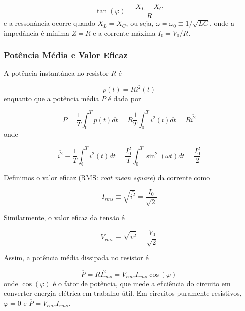 \documentclass{article}
\begin{document}
\begin{equation}
    \tan(\varphi) = \frac{X_L - X_C}{R}
\end{equation} e a ressonância ocorre quando \(X_L = X_C\), ou seja, \(\omega = \omega_0 \equiv 1/\sqrt{LC}\), onde a impedância é mínima \(Z = R\) e a corrente máxima \(I_0 = V_0/R\).

\subsubsection{Potência Média e Valor Eficaz}

A potência instantânea no resistor \(R\) é

\begin{equation}
    p(t) = Ri^2(t)
\end{equation} enquanto que a potência média \(\overline{P}\) é dada por

\begin{equation}
    \overline{P} = \frac{1}{T} \int_0^T p(t) dt = R \frac{1}{T} \int_0^T i^2(t) dt = R\overline{i^2}
\end{equation} onde 

\begin{equation}
    \overline{i^2} \equiv \frac{1}{T} \int_0^T i^2(t) dt = \frac{I_0^2}{T} \int_0^T \sin^2(\omega t) dt = \frac{I_0^2}{2}
\end{equation}

Definimos o valor eficaz (RMS: \emph{root mean square}) da corrente como

\begin{equation}
    \boxed{I_{rms} \equiv \sqrt{\overline{i^2}} = \frac{I_0}{\sqrt{2}}}
\end{equation}

Similarmente, o valor eficaz da tensão é

\begin{equation}
    \boxed{V_{rms} \equiv \sqrt{\overline{v^2}} = \frac{V_0}{\sqrt{2}}}
\end{equation}

Assim, a potência média dissipada no resistor é

\begin{equation}
    \boxed{\overline{P} = R I_{rms}^2 = V_{rms} I_{rms} \cos(\varphi)}
\end{equation} onde \(\cos(\varphi)\) é o fator de potência, que mede a eficiência do circuito em converter energia elétrica em trabalho útil. Em circuitos puramente resistivos, \(\varphi = 0\) e \(\overline{P} = V_{rms} I_{rms}\).
\end{document}

